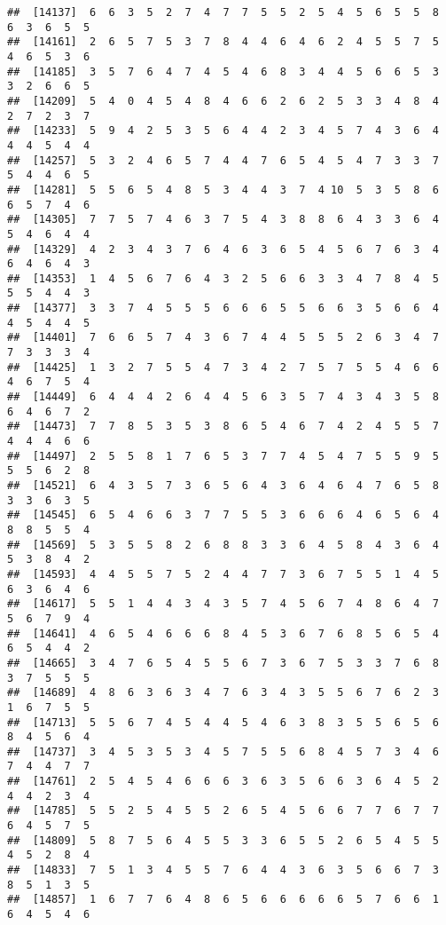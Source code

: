 \documentclass[
]{book}
\begin{document}
\begin{verbatim}
##  [14137]  6  6  3  5  2  7  4  7  7  5  5  2  5  4  5  6  5  5  8  6  3  6  5  5
##  [14161]  2  6  5  7  5  3  7  8  4  4  6  4  6  2  4  5  5  7  5  4  6  5  3  6
##  [14185]  3  5  7  6  4  7  4  5  4  6  8  3  4  4  5  6  6  5  3  3  2  6  6  5
##  [14209]  5  4  0  4  5  4  8  4  6  6  2  6  2  5  3  3  4  8  4  2  7  2  3  7
##  [14233]  5  9  4  2  5  3  5  6  4  4  2  3  4  5  7  4  3  6  4  4  4  5  4  4
##  [14257]  5  3  2  4  6  5  7  4  4  7  6  5  4  5  4  7  3  3  7  5  4  4  6  5
##  [14281]  5  5  6  5  4  8  5  3  4  4  3  7  4 10  5  3  5  8  6  6  5  7  4  6
##  [14305]  7  7  5  7  4  6  3  7  5  4  3  8  8  6  4  3  3  6  4  5  4  6  4  4
##  [14329]  4  2  3  4  3  7  6  4  6  3  6  5  4  5  6  7  6  3  4  6  4  6  4  3
##  [14353]  1  4  5  6  7  6  4  3  2  5  6  6  3  3  4  7  8  4  5  5  5  4  4  3
##  [14377]  3  3  7  4  5  5  5  6  6  6  5  5  6  6  3  5  6  6  4  4  5  4  4  5
##  [14401]  7  6  6  5  7  4  3  6  7  4  4  5  5  5  2  6  3  4  7  7  3  3  3  4
##  [14425]  1  3  2  7  5  5  4  7  3  4  2  7  5  7  5  5  4  6  6  4  6  7  5  4
##  [14449]  6  4  4  4  2  6  4  4  5  6  3  5  7  4  3  4  3  5  8  6  4  6  7  2
##  [14473]  7  7  8  5  3  5  3  8  6  5  4  6  7  4  2  4  5  5  7  4  4  4  6  6
##  [14497]  2  5  5  8  1  7  6  5  3  7  7  4  5  4  7  5  5  9  5  5  5  6  2  8
##  [14521]  6  4  3  5  7  3  6  5  6  4  3  6  4  6  4  7  6  5  8  3  3  6  3  5
##  [14545]  6  5  4  6  6  3  7  7  5  5  3  6  6  6  4  6  5  6  4  8  8  5  5  4
##  [14569]  5  3  5  5  8  2  6  8  8  3  3  6  4  5  8  4  3  6  4  5  3  8  4  2
##  [14593]  4  4  5  5  7  5  2  4  4  7  7  3  6  7  5  5  1  4  5  6  3  6  4  6
##  [14617]  5  5  1  4  4  3  4  3  5  7  4  5  6  7  4  8  6  4  7  5  6  7  9  4
##  [14641]  4  6  5  4  6  6  6  8  4  5  3  6  7  6  8  5  6  5  4  6  5  4  4  2
##  [14665]  3  4  7  6  5  4  5  5  6  7  3  6  7  5  3  3  7  6  8  3  7  5  5  5
##  [14689]  4  8  6  3  6  3  4  7  6  3  4  3  5  5  6  7  6  2  3  1  6  7  5  5
##  [14713]  5  5  6  7  4  5  4  4  5  4  6  3  8  3  5  5  6  5  6  8  4  5  6  4
##  [14737]  3  4  5  3  5  3  4  5  7  5  5  6  8  4  5  7  3  4  6  7  4  4  7  7
##  [14761]  2  5  4  5  4  6  6  6  3  6  3  5  6  6  3  6  4  5  2  4  4  2  3  4
##  [14785]  5  5  2  5  4  5  5  2  6  5  4  5  6  6  7  7  6  7  7  6  4  5  7  5
##  [14809]  5  8  7  5  6  4  5  5  3  3  6  5  5  2  6  5  4  5  5  4  5  2  8  4
##  [14833]  7  5  1  3  4  5  5  7  6  4  4  3  6  3  5  6  6  7  3  8  5  1  3  5
##  [14857]  1  6  7  7  6  4  8  6  5  6  6  6  6  6  5  7  6  6  1  6  4  5  4  6

\end{verbatim}
\end{document}
